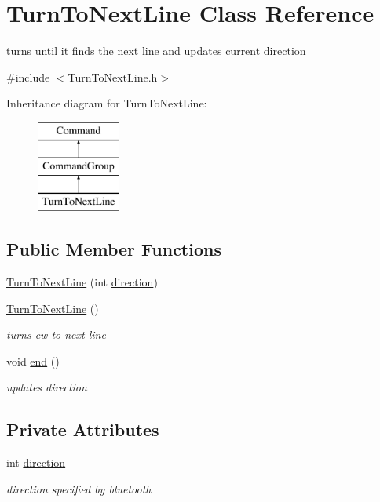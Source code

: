 \hypertarget{classTurnToNextLine}{\section{Turn\-To\-Next\-Line Class Reference}
\label{classTurnToNextLine}
}


turns until it finds the next line and updates current direction  




{\ttfamily \#include $<$Turn\-To\-Next\-Line.\-h$>$}

Inheritance diagram for Turn\-To\-Next\-Line\-:\begin{figure}[H]
\begin{center}
\leavevmode
\includegraphics[height=3.000000cm]{classTurnToNextLine}
\end{center}
\end{figure}
\subsection*{Public Member Functions}
\begin{DoxyCompactItemize}
\item 
\hyperlink{classTurnToNextLine_adf08caa64eb869d5aad0d49f4f491e84}{Turn\-To\-Next\-Line} (int \hyperlink{classTurnToNextLine_a20415d3992141e6187fa25397373d330}{direction})
\item 
\hyperlink{classTurnToNextLine_af7924c8caf2cd6e2f7b2ba5d773bfe83}{Turn\-To\-Next\-Line} ()
\begin{DoxyCompactList}\small\item\em turns cw to next line \end{DoxyCompactList}\item 
void \hyperlink{classTurnToNextLine_a79081a085e73cdb82d71770c996f5b1b}{end} ()
\begin{DoxyCompactList}\small\item\em updates direction \end{DoxyCompactList}\end{DoxyCompactItemize}
\subsection*{Private Attributes}
\begin{DoxyCompactItemize}
\item 
int \hyperlink{classTurnToNextLine_a20415d3992141e6187fa25397373d330}{direction}
\begin{DoxyCompactList}\small\item\em direction specified by bluetooth \end{DoxyCompactList}\end{DoxyCompactItemize}

